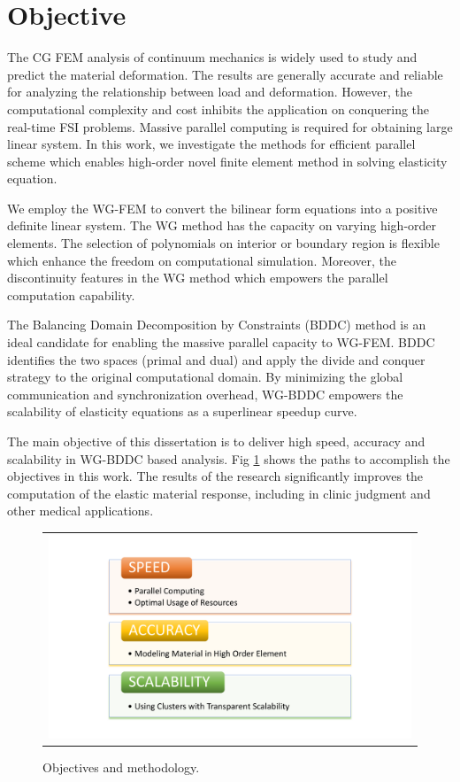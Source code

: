 \section{Objective}

The CG FEM analysis of continuum mechanics is widely used to study and predict the material deformation. The results are generally accurate and reliable for analyzing the relationship between load and deformation. However, the computational complexity and cost inhibits the application on conquering the real-time FSI problems. Massive parallel computing is required for obtaining large linear system. In this work, we investigate the methods for efficient parallel scheme which enables high-order novel finite element method in solving elasticity equation.

We employ the WG-FEM to convert the bilinear form equations into a positive definite linear system. The WG method has the capacity on varying high-order elements. The selection of polynomials on interior or boundary region is flexible which enhance the freedom on computational simulation. Moreover, the discontinuity features in the WG method which empowers the parallel computation capability.

The Balancing Domain Decomposition by Constraints (BDDC) method is an ideal candidate for enabling the massive parallel capacity to WG-FEM. BDDC identifies the two spaces (primal and dual) and apply the divide and conquer strategy to the original computational domain. By minimizing the global communication and synchronization overhead,  WG-BDDC empowers the scalability of elasticity equations as a superlinear speedup curve.

The main objective of this dissertation is to deliver high speed, accuracy and scalability in WG-BDDC based analysis. Fig \ref{fig: ch1p4} shows the paths to accomplish the objectives in this work. The results of the research significantly improves the computation of the elastic material response, including in clinic judgment and other medical applications.

\begin{figure}[H]
	\centering
	\begin{tabular}{c}
		\includegraphics[width=1.0\textwidth]{./pics/ch1p4}
	\end{tabular}
	\caption{\footnotesize Objectives and methodology.} \label{fig: ch1p4}
\end{figure}

